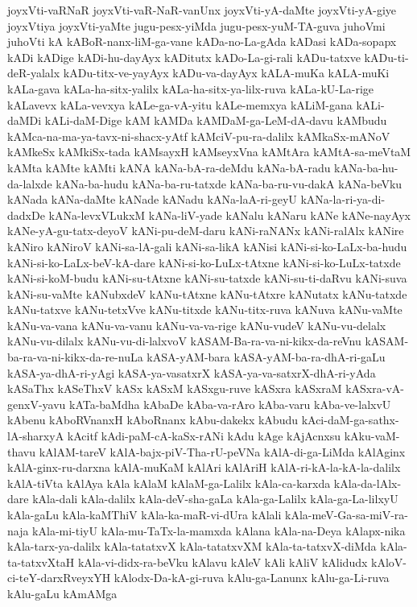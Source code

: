 {joyxVti-vaRNaR
joyxVti-vaR-NaR-vanUnx
joyxVti-yA-daMte
joyxVti-yA-giye
joyxVtiya
joyxVti-yaMte
jugu-pesx-yiMda
jugu-pesx-yuM-TA-guva
juhoVmi
juhoVti
kA
kABoR-nanx-liM-ga-vane
kADa-no-La-gAda
kADasi
kADa-sopapx
kADi
kADige
kADi-hu-dayAyx
kADitutx
kADo-La-gi-rali
kADu-tatxve
kADu-ti-deR-yalalx
kADu-titx-ve-yayAyx
kADu-va-dayAyx
kALA-muKa
kALA-muKi
kALa-gava
kALa-ha-sitx-yalilx
kALa-ha-sitx-ya-lilx-ruva
kALa-kU-La-rige
kALavevx
kALa-vevxya
kALe-ga-vA-yitu
kALe-memxya
kALiM-gana
kALi-daMDi
kALi-daM-Dige
kAM
kAMDa
kAMDaM-ga-LeM-dA-davu
kAMbudu
kAMca-na-ma-ya-tavx-ni-shacx-yAtf
kAMciV-pu-ra-dalilx
kAMkaSx-mANoV
kAMkeSx
kAMkiSx-tada
kAMsayxH
kAMseyxVna
kAMtAra
kAMtA-sa-meVtaM
kAMta
kAMte
kAMti
kANA
kANa-bA-ra-deMdu
kANa-bA-radu
kANa-ba-hu-da-lalxde
kANa-ba-hudu
kANa-ba-ru-tatxde
kANa-ba-ru-vu-dakA
kANa-beVku
kANada
kANa-daMte
kANade
kANadu
kANa-laA-ri-geyU
kANa-la-ri-ya-di-dadxDe
kANa-levxVLukxM
kANa-liV-yade
kANalu
kANaru
kANe
kANe-nayAyx
kANe-yA-gu-tatx-deyoV
kANi-pu-deM-daru
kANi-raNANx
kANi-ralAlx
kANire
kANiro
kANiroV
kANi-sa-lA-gali
kANi-sa-likA
kANisi
kANi-si-ko-LaLx-ba-hudu
kANi-si-ko-LaLx-beV-kA-dare
kANi-si-ko-LuLx-tAtxne
kANi-si-ko-LuLx-tatxde
kANi-si-koM-budu
kANi-su-tAtxne
kANi-su-tatxde
kANi-su-ti-daRvu
kANi-suva
kANi-su-vaMte
kANubxdeV
kANu-tAtxne
kANu-tAtxre
kANutatx
kANu-tatxde
kANu-tatxve
kANu-tetxVve
kANu-titxde
kANu-titx-ruva
kANuva
kANu-vaMte
kANu-va-vana
kANu-va-vanu
kANu-va-va-rige
kANu-vudeV
kANu-vu-delalx
kANu-vu-dilalx
kANu-vu-di-lalxvoV
kASAM-Ba-ra-va-ni-kikx-da-reVnu
kASAM-ba-ra-va-ni-kikx-da-re-nuLa
kASA-yAM-bara
kASA-yAM-ba-ra-dhA-ri-gaLu
kASA-ya-dhA-ri-yAgi
kASA-ya-vasatxrX
kASA-ya-va-satxrX-dhA-ri-yAda
kASaThx
kASeThxV
kASx
kASxM
kASxgu-ruve
kASxra
kASxraM
kASxra-vA-genxV-yavu
kATa-baMdha
kAbaDe
kAba-va-rAro
kAba-varu
kAba-ve-lalxvU
kAbenu
kAboRVnanxH
kAboRnanx
kAbu-dakekx
kAbudu
kAci-daM-ga-sathx-lA-sharxyA
kAcitf
kAdi-paM-cA-kaSx-rANi
kAdu
kAge
kAjAcnxsu
kAku-vaM-thavu
kAlAM-tareV
kAlA-bajx-piV-Tha-rU-peVNa
kAlA-di-ga-LiMda
kAlAginx
kAlA-ginx-ru-darxna
kAlA-muKaM
kAlAri
kAlAriH
kAlA-ri-kA-la-kA-la-dalilx
kAlA-tiVta
kAlAya
kAla
kAlaM
kAlaM-ga-Lalilx
kAla-ca-karxda
kAla-da-lAlx-dare
kAla-dali
kAla-dalilx
kAla-deV-sha-gaLa
kAla-ga-Lalilx
kAla-ga-La-lilxyU
kAla-gaLu
kAla-kaMThiV
kAla-ka-maR-vi-dUra
kAlali
kAla-meV-Ga-sa-miV-ra-naja
kAla-mi-tiyU
kAla-mu-TaTx-la-mamxda
kAlana
kAla-na-Deya
kAlapx-nika
kAla-tarx-ya-dalilx
kAla-tatatxvX
kAla-tatatxvXM
kAla-ta-tatxvX-diMda
kAla-ta-tatxvXtaH
kAla-vi-didx-ra-beVku
kAlavu
kAleV
kAli
kAliV
kAlidudx
kAloV-ci-teY-darxRveyxYH
kAlodx-Da-kA-gi-ruva
kAlu-ga-Lanunx
kAlu-ga-Li-ruva
kAlu-gaLu
kAmAMga
}
